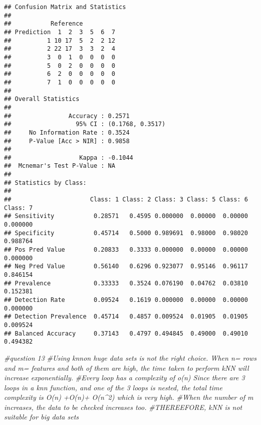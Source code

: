 \documentclass[]{article}
\newenvironment{Shaded}{\begin{snugshade}}{\end{snugshade}}
\newcommand{\CommentTok}[1]{\textcolor[rgb]{0.56,0.35,0.01}{\textit{#1}}}
\begin{document}
\begin{verbatim}
## Confusion Matrix and Statistics
## 
##           Reference
## Prediction  1  2  3  5  6  7
##          1 10 17  5  2  2 12
##          2 22 17  3  3  2  4
##          3  0  1  0  0  0  0
##          5  0  2  0  0  0  0
##          6  2  0  0  0  0  0
##          7  1  0  0  0  0  0
## 
## Overall Statistics
##                                           
##                Accuracy : 0.2571          
##                  95% CI : (0.1768, 0.3517)
##     No Information Rate : 0.3524          
##     P-Value [Acc > NIR] : 0.9858          
##                                           
##                   Kappa : -0.1044         
##  Mcnemar's Test P-Value : NA              
## 
## Statistics by Class:
## 
##                      Class: 1 Class: 2 Class: 3 Class: 5 Class: 6 Class: 7
## Sensitivity           0.28571   0.4595 0.000000  0.00000  0.00000 0.000000
## Specificity           0.45714   0.5000 0.989691  0.98000  0.98020 0.988764
## Pos Pred Value        0.20833   0.3333 0.000000  0.00000  0.00000 0.000000
## Neg Pred Value        0.56140   0.6296 0.923077  0.95146  0.96117 0.846154
## Prevalence            0.33333   0.3524 0.076190  0.04762  0.03810 0.152381
## Detection Rate        0.09524   0.1619 0.000000  0.00000  0.00000 0.000000
## Detection Prevalence  0.45714   0.4857 0.009524  0.01905  0.01905 0.009524
## Balanced Accuracy     0.37143   0.4797 0.494845  0.49000  0.49010 0.494382
\end{verbatim}

\begin{Shaded}
\begin{Highlighting}[]
\CommentTok{#question 13}
\CommentTok{#Using knnon huge data sets is not the right choice. When n= rows and m= features and both of them are high, the time taken to perform kNN will increase exponentially. }
\CommentTok{#Every loop has a complexity of o(n) Since there are 3 loops in a knn function, and one of the 3 loops is nested, the total time complexity is O(n) +O(n)+ O(n^2) which is very high.}
\CommentTok{#When the number of m increases, the data to be checked increases too. }
\CommentTok{#THEREEFORE, kNN is not suitable for big data sets}
\end{Highlighting}
\end{Shaded}
\end{document}
